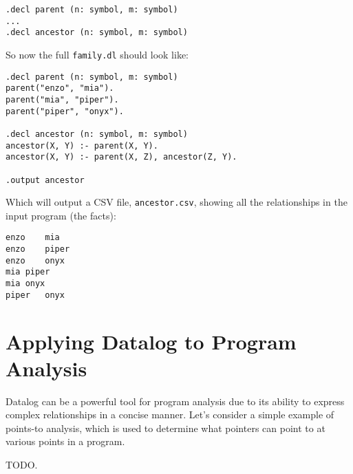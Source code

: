 \documentclass{article}
\theoremstyle{definition}
\begin{document}
\begin{verbatim}
.decl parent (n: symbol, m: symbol)
...
.decl ancestor (n: symbol, m: symbol)
\end{verbatim}

So now the full \texttt{family.dl} should look like:
\begin{verbatim}
.decl parent (n: symbol, m: symbol)
parent("enzo", "mia").
parent("mia", "piper").
parent("piper", "onyx").

.decl ancestor (n: symbol, m: symbol)
ancestor(X, Y) :- parent(X, Y).
ancestor(X, Y) :- parent(X, Z), ancestor(Z, Y).

.output ancestor
\end{verbatim}

Which will output a CSV file, \texttt{ancestor.csv}, showing all the relationships in the input program (the facts):
\begin{verbatim}
enzo	mia
enzo	piper
enzo	onyx
mia	piper
mia	onyx
piper	onyx
\end{verbatim}

\section{Applying Datalog to Program Analysis}
Datalog can be a powerful tool for program analysis due to its ability to express complex relationships in a concise manner. Let's consider a simple example of points-to analysis, which is used to determine what pointers can point to at various points in a program.

TODO.
\\
\\
\end{document}
